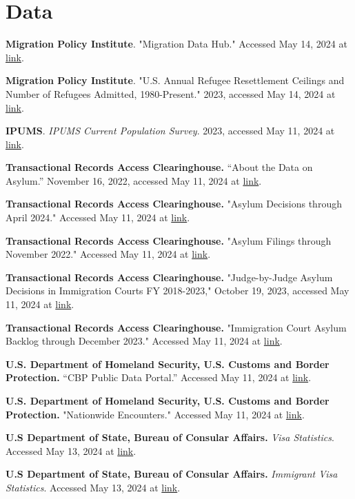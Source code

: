 \documentclass{article}
\begin{document}
\section{Data}

\begin{hangparas}{.25in}{1}

\textbf{Migration Policy Institute}. "Migration Data Hub." Accessed May 14, 2024 at \href{https://www.migrationpolicy.org/programs/migration-data-hub}{link}.

\textbf{Migration Policy Institute}. "U.S. Annual Refugee Resettlement Ceilings and Number of Refugees Admitted, 1980-Present." 2023, accessed May 14, 2024 at \href{https://www.migrationpolicy.org/programs/data-hub/charts/us-refugee-resettlement}{link}.

\textbf{IPUMS}. \textit{IPUMS Current Population Survey}. 2023, accessed May 11, 2024 at \href{https://doi.org/10.18128/D030.V11.0}{link}.

\textbf{Transactional Records Access Clearinghouse.} “About the Data on Asylum.” November 16, 2022, accessed May 11, 2024 at \href{https://tinyurl.com/yn9s2vbx}{link}. 

\textbf{Transactional Records Access Clearinghouse.} "Asylum Decisions through April 2024." Accessed May 11, 2024 at \href{https://tinyurl.com/5n8pe5rn}{link}. 

\textbf{Transactional Records Access Clearinghouse.} "Asylum Filings through November 2022." Accessed May 11, 2024 at \href{https://tinyurl.com/3dkay4yr}{link}. 

\textbf{Transactional Records Access Clearinghouse.} "Judge-by-Judge Asylum Decisions in Immigration Courts FY 2018-2023," October 19, 2023, accessed May 11, 2024 at \href{https://tinyurl.com/3zanp3xj}{link}. 

\textbf{Transactional Records Access Clearinghouse.} "Immigration Court Asylum Backlog through December 2023." Accessed May 11, 2024 at \href{https://tinyurl.com/3pw26wcj}{link}. 

\textbf{U.S. Department of Homeland Security, U.S. Customs and Border Protection.} “CBP Public Data Portal.” Accessed May 11, 2024 at \href{https://www.cbp.gov/newsroom/stats/cbp-public-data-portal}{link}. 

\textbf{U.S. Department of Homeland Security, U.S. Customs and Border Protection.} "Nationwide Encounters." Accessed May 11, 2024 at \href{https://www.cbp.gov/document/stats/nationwide-encounters}{link}. 

\textbf{U.S Department of State, Bureau of Consular Affairs.} \textit{Visa Statistics}. Accessed May 13, 2024 at \href{https://travel.state.gov/content/travel/en/legal/visa-law0/visa-statistics.html}{link}. 

\textbf{U.S Department of State, Bureau of Consular Affairs.} \textit{Immigrant Visa Statistics}. Accessed May 13, 2024 at \href{https://travel.state.gov/content/travel/en/legal/visa-law0/visa-statistics/immigrant-visa-statistics.html}{link}. 

\end{hangparas}
\end{document}

